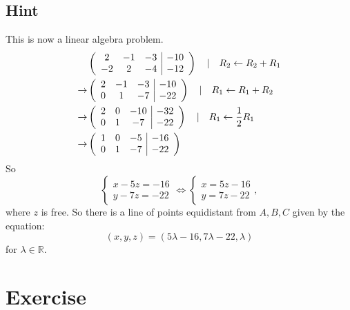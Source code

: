 \documentclass[a4paper,10pt]{article}
\begin{document}
\subsection{Hint}
This is now a linear algebra problem.
\begin{align*}
     & \left(
    \begin{array}{c c c|c}
            2  & -1 & -3 & -10 \\
            -2 & 2  & -4 & -12 \\
        \end{array}
    \right) \quad | \quad R_2 \leftarrow R_2 + R_1       \\ \rightarrow
     & \left(
    \begin{array}{c c c|c}
            2 & -1 & -3 & -10 \\
            0 & 1  & -7 & -22 \\
        \end{array}
    \right) \quad | \quad R_1 \leftarrow R_1 + R_2       \\ \rightarrow
     & \left(
    \begin{array}{c c c|c}
            2 & 0 & -10 & -32 \\
            0 & 1 & -7  & -22 \\
        \end{array}
    \right) \quad | \quad R_1 \leftarrow \frac{1}{2} R_1 \\ \rightarrow
     & \left(
    \begin{array}{c c c|c}
            1 & 0 & -5 & -16 \\
            0 & 1 & -7 & -22 \\
        \end{array}
    \right)
\end{align*}
So
\[
    \begin{cases}
        x - 5z = -16 \\
        y - 7z = -22
    \end{cases} \iff \begin{cases}
        x = 5z - 16 \\
        y = 7z - 22
    \end{cases},
\]
where $z$ is free. So there is a line of points equidistant from $A, B, C$ given by the equation:
\[
    (x, y, z) = (5\lambda - 16, 7\lambda - 22, \lambda)
\]
for $\lambda\in\mathbb{R}$.

\clearpage

\section{Exercise}
\end{document}
